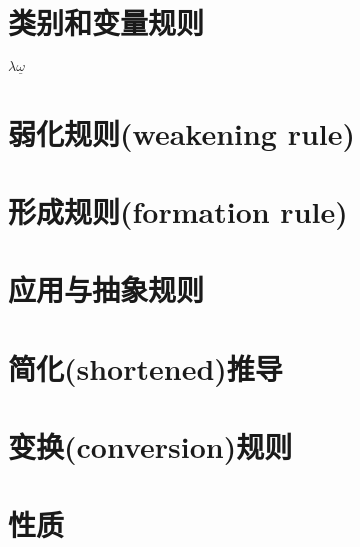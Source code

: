 \documentclass[UTF8,aspectratio=169,mathserif]{beamer}
\begin{document}
	\section{类别和变量规则}
	\begin{frame}
		$\lambda{\underline{\omega}}$
	\end{frame}

	\section{弱化规则(weakening rule)}
	\begin{frame}
		
	\end{frame}

	\section{形成规则(formation rule)}
	\begin{frame}
		
	\end{frame}

	\section{应用与抽象规则}
	\begin{frame}
		
	\end{frame}

	\section{简化(shortened)推导}
	\begin{frame}
		
	\end{frame}

	\section{变换(conversion)规则}
	\begin{frame}
		
	\end{frame}

	\section{性质}
	\begin{frame}
		
	\end{frame}
	
\end{document}
